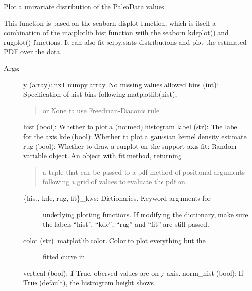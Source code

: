 \documentclass[letterpaper,10pt,english]{sphinxmanual}
\begin{document}
\begin{fulllineitems}
\label{\detokenize{Plot:pyleoclim.Plot.plot_hist}}
Plot a univariate distribution of the PaleoData values

This function is based on the seaborn displot function, which is
itself a combination of the matplotlib hist function with the 
seaborn kdeplot() and rugplot() functions. It can also fit 
scipy.stats distributions and plot the estimated PDF over the data.
\begin{description}
\item[{Args:}] \leavevmode
y (array): nx1 numpy array. No missing values allowed 
bins (int): Specification of hist bins following matplotlib(hist),
\begin{quote}

or None to use Freedman-Diaconis rule
\end{quote}

hist (bool): Whether to plot a (normed) histogram 
label (str): The label for the axis
kde (bool): Whether to plot a gaussian kernel density estimate
rug (bool): Whether to draw a rugplot on the support axis
fit: Random variable object. An object with fit method, returning
\begin{quote}

a tuple that can be passed to a pdf method of positional 
arguments following a grid of values to evaluate the pdf on.
\end{quote}
\begin{description}
\item[{\{hist, kde, rug, fit\}\_kws: Dictionaries. Keyword arguments for }] \leavevmode
underlying plotting functions. If modifying the dictionary, make
sure the labels “hist”, “kde”, “rug” and “fit” are still passed.

\item[{color (str): matplotlib color. Color to plot everything but the}] \leavevmode
fitted curve in.

\end{description}

vertical (bool): if True, oberved values are on y-axis.
norm\_hist (bool): If True (default), the histrogram height shows
\begin{quote}


\end{quote}
\end{description}
\end{fulllineitems}
\end{document}
